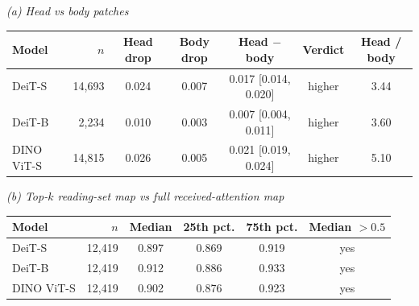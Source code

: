\small
\setlength{\tabcolsep}{4pt}
\textit{(a) Head vs body patches}\par\smallskip
\begin{tabular}{lrccccc}
\toprule
Model & $n$ & Head drop & Body drop & Head $-$ body & Verdict & Head / body \\
\midrule
DeiT-S & 14,693 & 0.024 & 0.007 & 0.017 {\scriptsize [0.014, 0.020]} & higher & 3.44 \\
DeiT-B & 2,234 & 0.010 & 0.003 & 0.007 {\scriptsize [0.004, 0.011]} & higher & 3.60 \\
DINO ViT-S & 14,815 & 0.026 & 0.005 & 0.021 {\scriptsize [0.019, 0.024]} & higher & 5.10 \\
\bottomrule
\end{tabular}
\par\medskip\textit{(b) Top-$k$ reading-set map vs full received-attention map}\par\smallskip
\begin{tabular}{lrcccc}
\toprule
Model & $n$ & Median & 25th pct. & 75th pct. & Median $> 0.5$ \\
\midrule
DeiT-S & 12,419 & 0.897 & 0.869 & 0.919 & yes \\
DeiT-B & 12,419 & 0.912 & 0.886 & 0.933 & yes \\
DINO ViT-S & 12,419 & 0.902 & 0.876 & 0.923 & yes \\
\bottomrule
\end{tabular}

